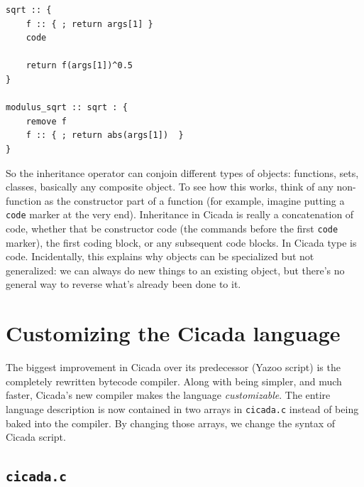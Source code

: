 \documentclass{article}
\newenvironment{code}{
       \begin{list}{}{
               \setlength{\leftmargin}{.4in}
               \setlength{\rightmargin}{0in}
               \setlength{\topsep}{.2in}
       }
       \small
       \item[] }
       { \end{list}   }
\begin{document}
\begin{code} \begin{verbatim}
sqrt :: {
    f :: { ; return args[1] }
    code

    return f(args[1])^0.5
}

modulus_sqrt :: sqrt : {
    remove f
    f :: { ; return abs(args[1])  }
}
\end{verbatim} \end{code}

\noindent So the inheritance operator can conjoin different types of objects:  functions, sets, classes, basically any composite object.  To see how this works, think of any non-function as the constructor part of a function (for example, imagine putting a \verb#code# marker at the very end).  Inheritance in Cicada is really a concatenation of code, whether that be constructor code (the commands before the first \verb#code# marker), the first coding block, or any subsequent code blocks.  In Cicada type is code.  Incidentally, this explains why objects can be specialized but not generalized:  we can always do new things to an existing object, but there's no general way to reverse what's already been done to it.



\newpage








\section{Customizing the Cicada language}

The biggest improvement in Cicada over its predecessor (Yazoo script) is the completely rewritten bytecode compiler.  Along with being simpler, and much faster, Cicada's new compiler makes the language \emph{customizable}.  The entire language description is now contained in two arrays in \verb#cicada.c# instead of being baked into the compiler.  By changing those arrays, we change the syntax of Cicada script.



\subsection{\texttt{cicada.c}}
\end{document}
